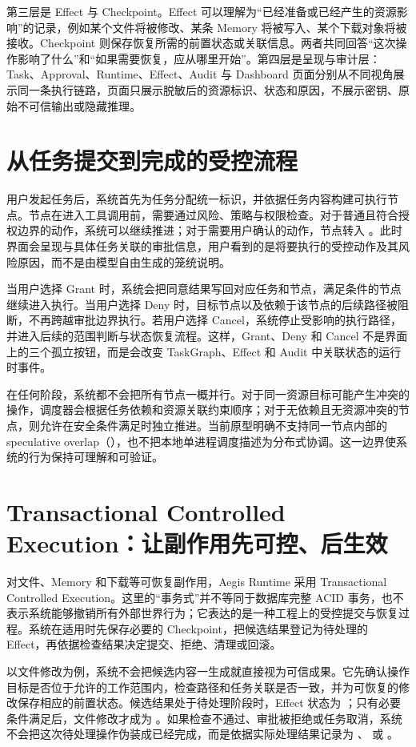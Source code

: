 第三层是 Effect 与 Checkpoint。Effect 可以理解为“已经准备或已经产生的资源影响”的记录，例如某个文件将被修改、某条 Memory 将被写入、某个下载对象将被接收。Checkpoint 则保存恢复所需的前置状态或关联信息。两者共同回答“这次操作影响了什么”和“如果需要恢复，应从哪里开始”。第四层是呈现与审计层：Task、Approval、Runtime、Effect、Audit 与 Dashboard 页面分别从不同视角展示同一条执行链路，页面只展示脱敏后的资源标识、状态和原因，不展示密钥、原始不可信输出或隐藏推理。

\section{从任务提交到完成的受控流程}

用户发起任务后，系统首先为任务分配统一标识，并依据任务内容构建可执行节点。节点在进入工具调用前，需要通过风险、策略与权限检查。对于普通且符合授权边界的动作，系统可以继续推进；对于需要用户确认的动作，节点转入 。此时界面会呈现与具体任务关联的审批信息，用户看到的是将要执行的受控动作及其风险原因，而不是由模型自由生成的笼统说明。

当用户选择 Grant 时，系统会把同意结果写回对应任务和节点，满足条件的节点继续进入执行。当用户选择 Deny 时，目标节点以及依赖于该节点的后续路径被阻断，不再跨越审批边界执行。若用户选择 Cancel，系统停止受影响的执行路径，并进入后续的范围判断与状态恢复流程。这样，Grant、Deny 和 Cancel 不是界面上的三个孤立按钮，而是会改变 TaskGraph、Effect 和 Audit 中关联状态的运行时事件。

在任何阶段，系统都不会把所有节点一概并行。对于同一资源目标可能产生冲突的操作，调度器会根据任务依赖和资源关联约束顺序；对于无依赖且无资源冲突的节点，则允许在安全条件满足时独立推进。当前原型明确不支持同一节点内部的 speculative overlap（），也不把本地单进程调度描述为分布式协调。这一边界使系统的行为保持可理解和可验证。

\section{Transactional Controlled Execution：让副作用先可控、后生效}

对文件、Memory 和下载等可恢复副作用，Aegis Runtime 采用 Transactional Controlled Execution。这里的“事务式”并不等同于数据库完整 ACID 事务，也不表示系统能够撤销所有外部世界行为；它表达的是一种工程上的受控提交与恢复过程。系统在适用时先保存必要的 Checkpoint，把候选结果登记为待处理的 Effect，再依据检查结果决定提交、拒绝、清理或回滚。

以文件修改为例，系统不会把候选内容一生成就直接视为可信成果。它先确认操作目标是否位于允许的工作范围内，检查路径和任务关联是否一致，并为可恢复的修改保存相应的前置状态。候选结果处于待处理阶段时，Effect 状态为 ；只有必要条件满足后，文件修改才成为 。如果检查不通过、审批被拒绝或任务取消，系统不会把这次待处理操作伪装成已经完成，而是依据实际处理结果记录为 、 或 。

